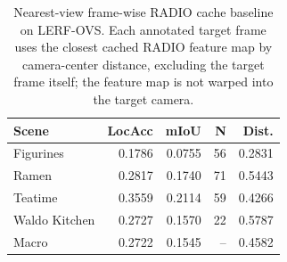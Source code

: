 \begin{table}[t]
\centering
\caption{Nearest-view frame-wise RADIO cache baseline on LERF-OVS. Each annotated target frame uses the closest cached RADIO feature map by camera-center distance, excluding the target frame itself; the feature map is not warped into the target camera.}
\label{tab:nearest_view_cache_baseline}
\begin{tabular}{lrrrr}
\toprule
Scene & LocAcc & mIoU & N & Dist. \\
\midrule
Figurines & 0.1786 & 0.0755 & 56 & 0.2831 \\
Ramen & 0.2817 & 0.1740 & 71 & 0.5443 \\
Teatime & 0.3559 & 0.2114 & 59 & 0.4266 \\
Waldo Kitchen & 0.2727 & 0.1570 & 22 & 0.5787 \\
\midrule
Macro & 0.2722 & 0.1545 & -- & 0.4582 \\
\bottomrule
\end{tabular}
\end{table}
